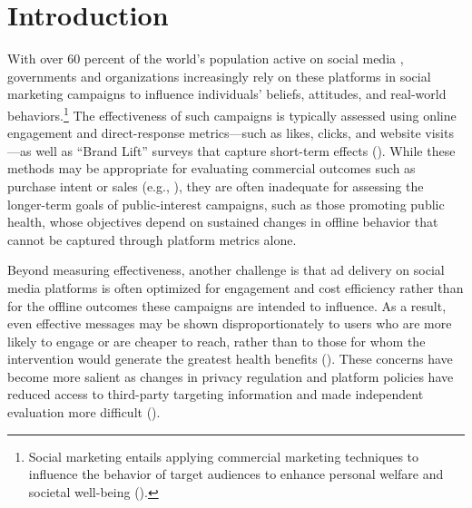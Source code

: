 
\vspace{-0.5cm}

\clearpage
\section{Introduction}
With over 60 percent of the world's population active on social media \citep{wearesocial2025}, governments and organizations increasingly rely on these platforms in social marketing campaigns to influence individuals’ beliefs, attitudes, and real-world behaviors.\footnote{Social marketing entails applying commercial marketing techniques to influence the behavior of target audiences to enhance personal welfare and societal well-being (\citealt{kotler1971social, andreasen1994social}).} The effectiveness of such campaigns is typically assessed using online engagement and direct-response metrics---such as likes, clicks, and website visits---as well as ``Brand Lift'' surveys that capture short-term effects (\citealt{atheycovid2023, Shawky2019}). While these methods may be appropriate for evaluating commercial outcomes such as purchase intent or sales (e.g., \citealt{bart2014products, johnson2017less}), they are often inadequate for assessing the longer-term goals of public-interest campaigns, such as those promoting public health, whose objectives depend on sustained changes in offline behavior that cannot be captured through platform metrics alone.

Beyond measuring effectiveness, another challenge is that ad delivery on social media platforms is often optimized for engagement and cost efficiency rather than for the offline outcomes these campaigns are intended to influence. As a result, even effective messages may be shown disproportionately to users who are more likely to engage or are cheaper to reach, rather than to those for whom the intervention would generate the greatest health benefits (\citealt{lambrecht2019algorithmic, sapiezynski2022algorithms, gordon2021inefficiencies}). These concerns have become more salient as changes in privacy regulation and platform policies have reduced access to third-party targeting information and made independent evaluation more difficult (\citealt{johnson2020consumer, goldfarb2011privacy}).



